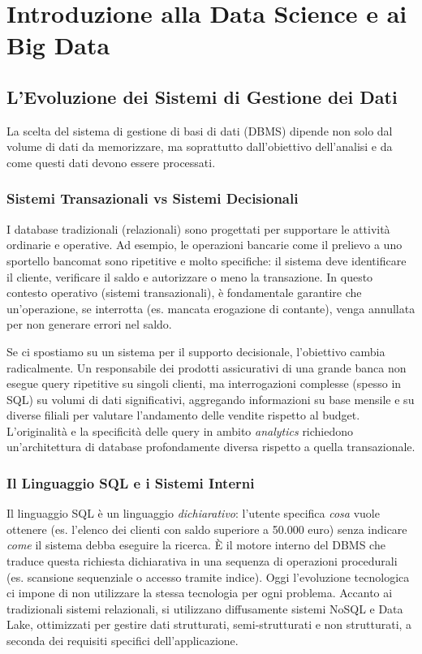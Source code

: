 \chapter{Introduzione alla Data Science e ai Big Data}

\section{L'Evoluzione dei Sistemi di Gestione dei Dati}
La scelta del sistema di gestione di basi di dati (DBMS) dipende non solo dal volume di dati da memorizzare, ma soprattutto dall'obiettivo dell'analisi e da come questi dati devono essere processati. 

\subsection{Sistemi Transazionali vs Sistemi Decisionali}
I database tradizionali (relazionali) sono progettati per supportare le attività ordinarie e operative. Ad esempio, le operazioni bancarie come il prelievo a uno sportello bancomat sono ripetitive e molto specifiche: il sistema deve identificare il cliente, verificare il saldo e autorizzare o meno la transazione. In questo contesto operativo (sistemi transazionali), è fondamentale garantire che un'operazione, se interrotta (es. mancata erogazione di contante), venga annullata per non generare errori nel saldo.

Se ci spostiamo su un sistema per il supporto decisionale, l'obiettivo cambia radicalmente. Un responsabile dei prodotti assicurativi di una grande banca non esegue query ripetitive su singoli clienti, ma interrogazioni complesse (spesso in SQL) su volumi di dati significativi, aggregando informazioni su base mensile e su diverse filiali per valutare l'andamento delle vendite rispetto al budget. L'originalità e la specificità delle query in ambito \textit{analytics} richiedono un'architettura di database profondamente diversa rispetto a quella transazionale. 

\subsection{Il Linguaggio SQL e i Sistemi Interni}
Il linguaggio SQL è un linguaggio \textit{dichiarativo}: l'utente specifica \textit{cosa} vuole ottenere (es. l'elenco dei clienti con saldo superiore a 50.000 euro) senza indicare \textit{come} il sistema debba eseguire la ricerca. È il motore interno del DBMS che traduce questa richiesta dichiarativa in una sequenza di operazioni procedurali (es. scansione sequenziale o accesso tramite indice). 
Oggi l'evoluzione tecnologica ci impone di non utilizzare la stessa tecnologia per ogni problema. Accanto ai tradizionali sistemi relazionali, si utilizzano diffusamente sistemi NoSQL e Data Lake, ottimizzati per gestire dati strutturati, semi-strutturati e non strutturati, a seconda dei requisiti specifici dell'applicazione.

